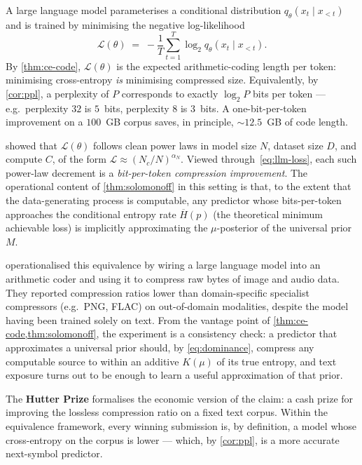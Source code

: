 A large language model parameterises a conditional distribution
$q_\theta(x_t \mid x_{<t})$ and is trained by minimising the
negative log-likelihood
\begin{equation}
  \mathcal{L}(\theta)
  \;=\; -\frac{1}{T}\sum_{t=1}^{T} \log_2 q_\theta(x_t \mid x_{<t}).
  \label{eq:llm-loss}
\end{equation}
By \cref{thm:ce-code}, $\mathcal{L}(\theta)$ is the expected
arithmetic-coding length per token: minimising cross-entropy
\emph{is} minimising compressed size.  Equivalently, by
\cref{cor:ppl}, a perplexity of $P$ corresponds to exactly
$\log_2 P$ bits per token --- e.g.\ perplexity $32$ is $5$~bits,
perplexity $8$ is $3$~bits.  A one-bit-per-token improvement on a
$100$~GB corpus saves, in principle, $\sim 12.5$~GB of code length.

\citet{kaplan2020scaling} showed that $\mathcal{L}(\theta)$ follows
clean power laws in model size $N$, dataset size $D$, and compute
$C$, of the form $\mathcal{L} \approx (N_c / N)^{\alpha_N}$.
Viewed through~\eqref{eq:llm-loss}, each such power-law decrement
is a \emph{bit-per-token compression improvement}.  The
operational content of \cref{thm:solomonoff} in this setting is
that, to the extent that the data-generating process is
computable, any predictor whose bits-per-token approaches the
conditional entropy rate $\overline{H}(p)$ (the theoretical
minimum achievable loss) is implicitly approximating the
$\mu$-posterior of the universal prior $M$.

\citet{deletang2024language} operationalised this equivalence by
wiring a large language model into an arithmetic coder and using
it to compress raw bytes of image and audio data.  They reported
compression ratios lower than domain-specific specialist
compressors (e.g.\ PNG, FLAC) on out-of-domain modalities, despite
the model having been trained solely on text.  From the vantage
point of \cref{thm:ce-code,thm:solomonoff}, the experiment is a
consistency check: a predictor that approximates a universal prior
should, by \eqref{eq:dominance}, compress any computable source to
within an additive $K(\mu)$ of its true entropy, and text exposure
turns out to be enough to learn a useful approximation of that
prior.

The \textbf{Hutter Prize} \citep{hutter2005universal} formalises
the economic version of the claim: a cash prize for improving the
lossless compression ratio on a fixed text corpus.  Within the
equivalence framework, every winning submission is, by definition,
a model whose cross-entropy on the corpus is lower --- which, by
\cref{cor:ppl}, is a more accurate next-symbol predictor.

